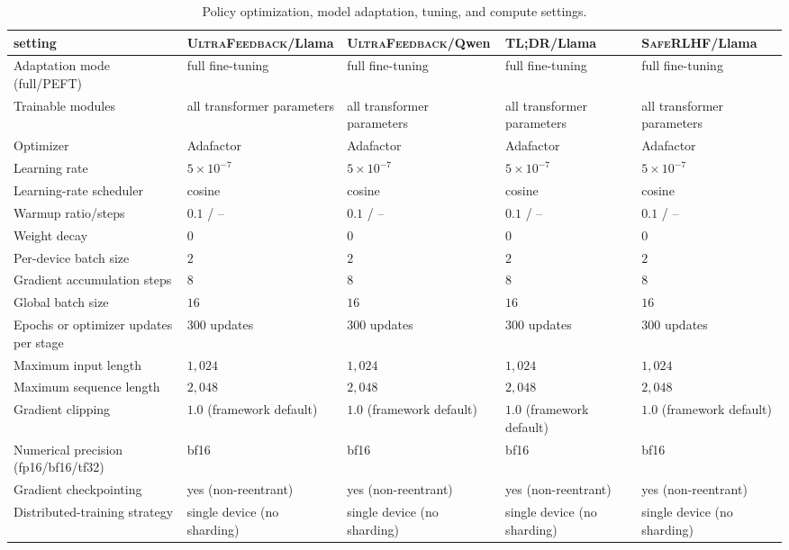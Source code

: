 \documentclass{article}
\theoremstyle{remark}
\theoremstyle{plain}
\begin{document}
\begin{table}[t]
\centering\scriptsize
\setlength{\tabcolsep}{1.1pt}
\caption{Policy optimization, model adaptation, tuning, and compute settings.}
\label{tab:policy-training-hparams}
\begin{tabular}{@{}p{}p{}p{}p{}p{}@{}}
\toprule
setting & \textsc{UltraFeedback}/Llama & \textsc{UltraFeedback}/Qwen & \textsc{TL;DR}/Llama & \textsc{SafeRLHF}/Llama \\
\midrule
Adaptation mode (full/PEFT) & full fine-tuning & full fine-tuning & full fine-tuning & full fine-tuning \\
Trainable modules & all transformer parameters & all transformer parameters & all transformer parameters & all transformer parameters \\
Optimizer & Adafactor & Adafactor & Adafactor & Adafactor \\
Learning rate & $5\times10^{-7}$ & $5\times10^{-7}$ & $5\times10^{-7}$ & $5\times10^{-7}$ \\
Learning-rate scheduler & cosine & cosine & cosine & cosine \\
Warmup ratio/steps & $0.1$ / -- & $0.1$ / -- & $0.1$ / -- & $0.1$ / -- \\
Weight decay & $0$ & $0$ & $0$ & $0$ \\
Per-device batch size & $2$ & $2$ & $2$ & $2$ \\
Gradient accumulation steps & $8$ & $8$ & $8$ & $8$ \\
Global batch size & $16$ & $16$ & $16$ & $16$ \\
Epochs or optimizer updates per stage & $300$ updates & $300$ updates & $300$ updates & $300$ updates \\
Maximum input length & $1{,}024$ & $1{,}024$ & $1{,}024$ & $1{,}024$ \\
Maximum sequence length & $2{,}048$ & $2{,}048$ & $2{,}048$ & $2{,}048$ \\
Gradient clipping & $1.0$ (framework default) & $1.0$ (framework default) & $1.0$ (framework default) & $1.0$ (framework default) \\
Numerical precision (fp16/bf16/tf32) & bf16 & bf16 & bf16 & bf16 \\
Gradient checkpointing & yes (non-reentrant) & yes (non-reentrant) & yes (non-reentrant) & yes (non-reentrant) \\
Distributed-training strategy & single device (no sharding) & single device (no sharding) & single device (no sharding) & single device (no sharding) \\

\end{tabular}
\end{table}
\end{document}
